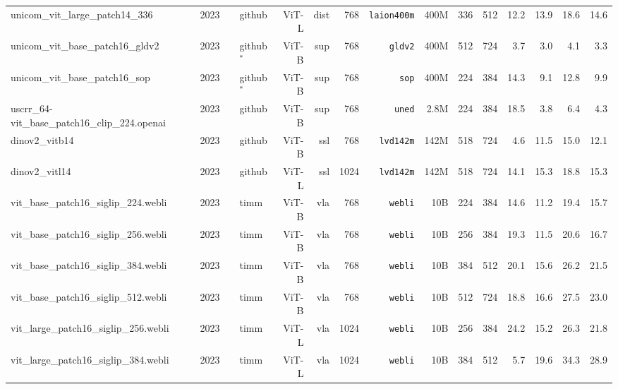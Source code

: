 \begin{tabular}{llllrrrrrrrRRRR}
unicom\_vit\_large\_patch14\_336                  & 2023 & \cite{ady+23}            & github      & ViT-L & dist     & 768  & \texttt{laion400m} & 400M & 336 & 512 & 12.2 & 13.9 & 18.6 & 14.6 \\
unicom\_vit\_base\_patch16\_gldv2                 & 2023 & \cite{ady+23}            & github$^*$  & ViT-B & sup      & 768  & \texttt{gldv2}     & 400M & 512 & 724 & 3.7  & 3.0  & 4.1  & 3.3  \\
unicom\_vit\_base\_patch16\_sop                   & 2023 & \cite{ady+23}            & github$^*$  & ViT-B & sup      & 768  & \texttt{sop}       & 400M & 224 & 384 & 14.3 & 9.1  & 12.8 & 9.9  \\
uscrr\_64-vit\_base\_patch16\_clip\_224.openai    & 2023 & \cite{ycc+23}            & github      & ViT-B & sup      & 768  & \texttt{uned}      & 2.8M & 224 & 384 & 18.5 & 3.8  & 6.4  & 4.3  \\
dinov2\_vitb14                                    & 2023 & \cite{odm+24}            & github      & ViT-B & ssl      & 768  & \texttt{lvd142m}   & 142M & 518 & 724 & 4.6  & 11.5 & 15.0 & 12.1 \\
dinov2\_vitl14                                    & 2023 & \cite{odm+24}            & github      & ViT-L & ssl      & 1024 & \texttt{lvd142m}   & 142M & 518 & 724 & 14.1 & 15.3 & 18.8 & 15.3 \\
vit\_base\_patch16\_siglip\_224.webli             & 2023 & \cite{siglip}            & timm        & ViT-B & vla      & 768  & \texttt{webli}     & 10B  & 224 & 384 & 14.6 & 11.2 & 19.4 & 15.7 \\
vit\_base\_patch16\_siglip\_256.webli             & 2023 & \cite{siglip}            & timm        & ViT-B & vla      & 768  & \texttt{webli}     & 10B  & 256 & 384 & 19.3 & 11.5 & 20.6 & 16.7 \\
vit\_base\_patch16\_siglip\_384.webli             & 2023 & \cite{siglip}            & timm        & ViT-B & vla      & 768  & \texttt{webli}     & 10B  & 384 & 512 & 20.1 & 15.6 & 26.2 & 21.5 \\
vit\_base\_patch16\_siglip\_512.webli             & 2023 & \cite{siglip}            & timm        & ViT-B & vla      & 768  & \texttt{webli}     & 10B  & 512 & 724 & 18.8 & 16.6 & 27.5 & 23.0 \\
vit\_large\_patch16\_siglip\_256.webli            & 2023 & \cite{siglip}            & timm        & ViT-L & vla      & 1024 & \texttt{webli}     & 10B  & 256 & 384 & 24.2 & 15.2 & 26.3 & 21.8 \\
vit\_large\_patch16\_siglip\_384.webli            & 2023 & \cite{siglip}            & timm        & ViT-L & vla      & 1024 & \texttt{webli}     & 10B  & 384 & 512 & 5.7  & 19.6 & 34.3 & 28.9 \\

\end{tabular}
